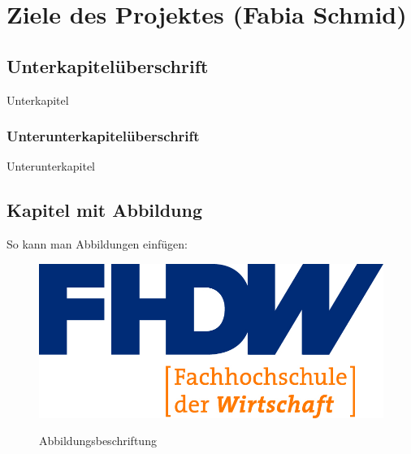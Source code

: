 \section{Ziele des Projektes (Fabia Schmid)}

\label{instal}

\subsection{Unterkapitelüberschrift}

Unterkapitel

\subsubsection{Unterunterkapitelüberschrift}

Unterunterkapitel

\subsection{Kapitel mit Abbildung}

So kann man Abbildungen einfügen:

\begin{figure}[H]
\centering
\begin{minipage}[t]{1\textwidth} %
\caption{Abbildungsbeschriftung} %
\includegraphics[width=1\textwidth]{img/fhdw}\\ %
\end{minipage}
\end{figure}

